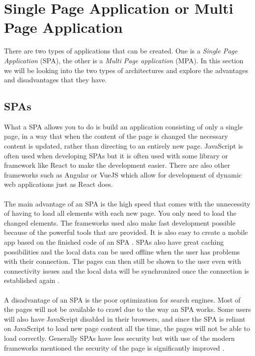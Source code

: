 \section{Single Page Application or Multi Page Application}
There are two types of applications that can be created.
One is a \textit{Single Page Application} (SPA), the other is a \textit{Multi Page application} (MPA).
In this section we will be looking into the two types of architectures and explore the advantages and disadvantages that they have.

\subsection{SPAs}
What a SPA allows you to do is build an application consisting of only a single page, in a way that when the content of the page is changed the necessary content is updated, rather than directing to an entirely new page.
JavaScript is often used when developing SPAs but it is often used with some library or framework like React to make the development easier.
There are also other frameworks such as Angular or VueJS which allow for development of dynamic web applications just as React does.
\\\\
The main advantage of an SPA is the high speed that comes with the unnecessity of having to load all elements with each new page.
You only need to load the changed elements.
The frameworks used also make fast development possible because of the powerful tools that are provided.
It is also easy to create a mobile app based on the finished code of an SPA \cite{SPAvsMPAMerehead}.
SPAs also have great caching possibilities and the local data can be used offline when the user has problems with their connection.
The pages can then still be shown to the user even with connectivity issues and the local data will be synchronized once the connection is established again \cite{SPAvsMPARuby}.
\\\\
A disadvantage of an SPA is the poor optimization for search engines.
Most of the pages will not be available to crawl due to the way an SPA works.
Some users will also have JavaScript disabled in their browsers, and since the SPA is reliant on JavaScript to load new page content all the time, the pages will not be able to load correctly.
Generally SPAs have less security but with use of the modern frameworks mentioned the security of the page is significantly improved \cite{SPAvsMPAMerehead}.

